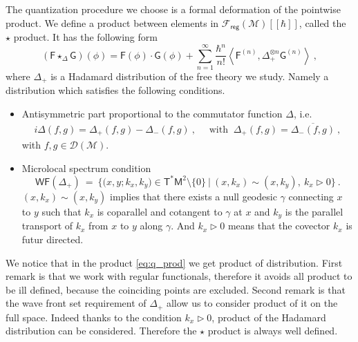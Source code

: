 \documentclass[12pt]{book}
\newcommand{\WF}{\mathsf{WF}}
\newcommand{\reg}{\mathsf{reg}}
\newcommand{\sm}[1]{\left\langle#1\right\rangle}
\newcommand{\Dcal}{\mathcal{D}}
\newcommand{\Fcal}{\mathcal{F}}
\newcommand{\Mcal}{\mathcal{M}}
\newcommand{\Fsf}{\mathsf{F}}
\newcommand{\Gsf}{\mathsf{G}}
\newcommand{\Msf}{\mathsf{M}}
\newcommand{\Tsf}{\mathsf{T}}
\theoremstyle{break}
\begin{document}
The quantization procedure we choose is a formal deformation of the pointwise product. We define a product between elements in $\Fcal_\reg(\Mcal)[[\hbar]]$, called the $\star$ product. It has the following form
%
\begin{equation}
(\Fsf \star_\Delta \Gsf)(\phi) = \Fsf(\phi) \cdot \Gsf(\phi) + \sum_{n=1}^\infty \frac{\hbar^n}{n!} \sm{ \Fsf^{(n)} , \Delta_+^{\otimes n} \Gsf^{(n) } } \ ,
\label{eq:q_prod}
\end{equation}
%
where $\Delta_+$ is a Hadamard distribution of the free theory we study. Namely a distribution which satisfies the following conditions.
%
\begin{itemize}
\item Antisymmetric part proportional to the commutator function $\Delta$, i.e. 
%
\begin{eqnarray*}
i \Delta(f,g) = \Delta_+(f,g) - \Delta_-(f,g) \ , \quad \mbox{ with } \ \Delta_+(f,g) = \overline{\Delta_-(f,g)} \ ,
\end{eqnarray*}
%
with $f,g \in \Dcal(\Mcal)$.

\item Microlocal spectrum condition
%
\begin{equation*}
\WF(\Delta_+) \ = \ \bigg\{ \bigg( x, y ; k_x, k_y \bigg) \in \Tsf^\ast\Msf^2 \setminus \{0\} \ \bigg| \ (x,k_x) \sim (x,k_y), \ k_x \triangleright 0 \bigg\} \ .
\label{eq:hadamard_condition}
\end{equation*}
%
$(x,k_x) \sim (x,k_y)$ implies that there exists a null geodesic $\gamma$ connecting $x$ to $y$ such that $k_x$ is coparallel and cotangent to $\gamma$ at $x$ and $k_y$ is the parallel transport of $k_x$ from $x$ to $y$ along $\gamma$. And $k_x \triangleright 0$ means that the covector $k_x$ is futur directed.

\end{itemize}


We notice that in the product \eqref{eq:q_prod} we get product of distribution. First remark is that we work with regular functionals, therefore it avoids all product to be ill defined, because the coinciding points are excluded. Second remark is that the wave front set requirement of $\Delta_+$ allow us to consider product of it on the full space. Indeed thanks to the condition $k_x \triangleright 0$, product of the Hadamard distribution can be considered. Therefore the $\star$ product is always well defined.


\end{document}
